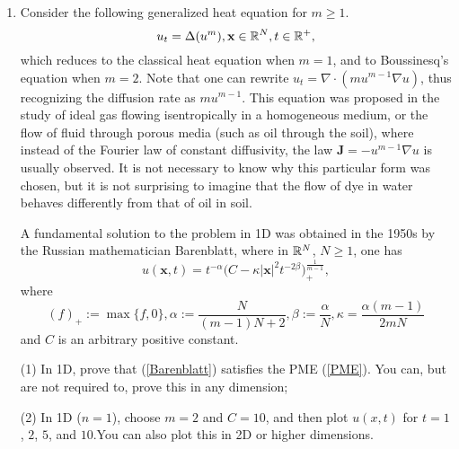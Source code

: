 \documentclass[6pt]{article}
\numberwithin{equation}{section}
\def\mathbb{\Bbb}
\begin{document}
\begin{enumerate}
\item  Consider the following generalized heat equation for $m\geq1$.
\begin{equation}\label{PME}
u_t= \Delta (u^m),\textbf{x}\in\mathbb R^N, t\in\mathbb R^+,
\end{equation}
which reduces to the classical heat equation when $m=1$, and to Boussinesq's equation when $m=2$.  Note that one can rewrite $u_t=\nabla \cdot (mu^{m-1} \nabla u)$, thus recognizing the diffusion rate as $mu^{m-1}$.  This equation was proposed in the study of ideal gas flowing isentropically in a homogeneous medium, or the flow of fluid through porous media (such as oil through the soil), where instead of the Fourier law of constant diffusivity, the law $\textbf{J}=- u^{m-1}\nabla u$ is usually observed.  It is not necessary to know why this particular form was chosen, but it is not surprising to imagine that the flow of dye in water behaves differently from that of oil in soil.

A fundamental solution to the problem in 1D was obtained in the 1950s by the Russian mathematician Barenblatt, where in $\mathbb R^N$, $N\geq1$, one has
\begin{equation}\label{Barenblatt}
u(\textbf{x},t)=t^{-\alpha}\Big(C-\kappa |\textbf{x}|^2t^{-2\beta}\Big)_+^\frac{1}{m-1},
\end{equation}
where
\[(f)_+:=\max\{f,0\}, \alpha:=\frac{N}{(m-1)N+2}, \beta:=\frac{\alpha}{N}, \kappa =\frac{\alpha(m-1)}{2mN}\]
and $C$ is an arbitrary positive constant.

(1) In 1D, prove that (\ref{Barenblatt}) satisfies the PME (\ref{PME}).  You can, but are not required to, prove this in any dimension;

(2) In 1D ($n=1$), choose $m=2$ and $C=10$, and then plot $u(x,t)$ for $t=1$, $2$, $5$, and $10$.You can also plot this in 2D or higher dimensions.

\end{enumerate}
\end{document}
